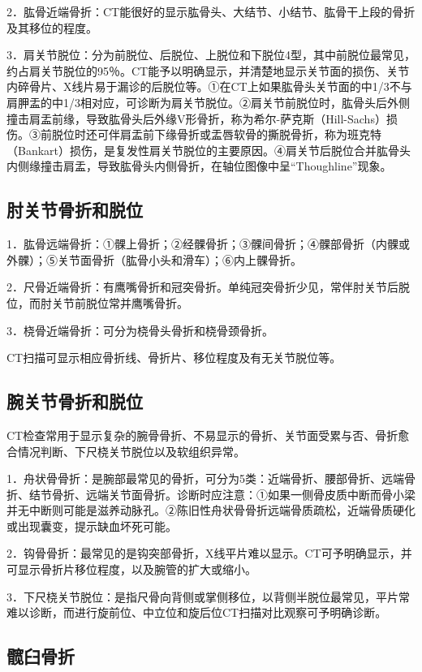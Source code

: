 2．肱骨近端骨折：CT能很好的显示肱骨头、大结节、小结节、肱骨干上段的骨折及其移位的程度。

3．肩关节脱位：分为前脱位、后脱位、上脱位和下脱位4型，其中前脱位最常见，约占肩关节脱位的95％。CT能予以明确显示，并清楚地显示关节面的损伤、关节内碎骨片、X线片易于漏诊的后脱位等。①在CT上如果肱骨头关节面的中1/3不与肩胛盂的中1/3相对应，可诊断为肩关节脱位。②肩关节前脱位时，肱骨头后外侧撞击肩盂前缘，导致肱骨头后外缘V形骨折，称为希尔-萨克斯（Hill-Sachs）损伤。③前脱位时还可伴肩盂前下缘骨折或盂唇软骨的撕脱骨折，称为班克特（Bankart）损伤，是复发性肩关节脱位的主要原因。④肩关节后脱位合并肱骨头内侧缘撞击肩盂，导致肱骨头内侧骨折，在轴位图像中呈“Thoughline”现象。

\subsection{肘关节骨折和脱位}

1．肱骨远端骨折：①髁上骨折；②经髁骨折；③髁间骨折；④髁部骨折（内髁或外髁）；⑤关节面骨折（肱骨小头和滑车）；⑥内上髁骨折。

2．尺骨近端骨折：有鹰嘴骨折和冠突骨折。单纯冠突骨折少见，常伴肘关节后脱位，而肘关节前脱位常并鹰嘴骨折。

3．桡骨近端骨折：可分为桡骨头骨折和桡骨颈骨折。

CT扫描可显示相应骨折线、骨折片、移位程度及有无关节脱位等。

\subsection{腕关节骨折和脱位}

CT检查常用于显示复杂的腕骨骨折、不易显示的骨折、关节面受累与否、骨折愈合情况判断、下尺桡关节脱位以及软组织异常。

1．舟状骨骨折：是腕部最常见的骨折，可分为5类：近端骨折、腰部骨折、远端骨折、结节骨折、远端关节面骨折。诊断时应注意：①如果一侧骨皮质中断而骨小梁并无中断则可能是滋养动脉孔。②陈旧性舟状骨骨折远端骨质疏松，近端骨质硬化或出现囊变，提示缺血坏死可能。

2．钩骨骨折：最常见的是钩突部骨折，X线平片难以显示。CT可予明确显示，并可显示骨折片移位程度，以及腕管的扩大或缩小。

3．下尺桡关节脱位：是指尺骨向背侧或掌侧移位，以背侧半脱位最常见，平片常难以诊断，而进行旋前位、中立位和旋后位CT扫描对比观察可予明确诊断。

\subsection{髋臼骨折}

